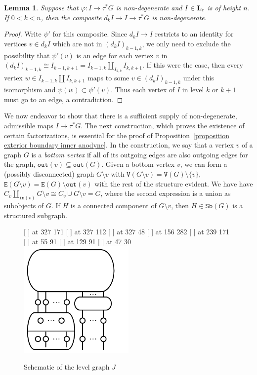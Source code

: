 \documentclass{amsart}
\numberwithin{theorem}{subsection}
\newtheorem{lemma}[theorem]{Lemma}
\theoremstyle{definition}
\newcommand{\name}[1]{\ensuremath{\text{\textup{#1}}}}
\newcommand{\levelg}{\mathbf{L}}
\newcommand{\levelgconn}{\levelg_{\name{c}}}
\newcommand{\sub}{\mathtt{Sb}}
\newcommand{\out}{\mathtt{out}}
\newcommand{\inp}{\mathtt{in}}
\newcommand{\edge}{\mathtt{E}}
\newcommand{\vertex}{\mathtt{V}}
\begin{document}
\begin{lemma}\label{lemma preservation of nondegeneracy}
Suppose that $\varphi \colon I \to \tau^* G$ is non-degenerate and $I \in \levelgconn$ is of height $n$.
If $0< k < n$, then the composite $d_k I \to I \to \tau^* G$ is non-degenerate.
\end{lemma}
\begin{proof}
Write $\psi'$ for this composite. 
Since $d_kI\to I$ restricts to an identity for vertices $v\in d_k I$ which are not in $(d_kI)_{k-1,k}$, we only need to exclude the possibility that $\psi'(v)$ is an edge for each vertex $v$ in $(d_kI)_{k-1,k} \cong I_{k-1,k+1} = I_{k-1,k} \amalg_{I_{k,k}} I_{k,k+1}$. 
If this were the case, then every vertex $w \in I_{k-1,k} \amalg I_{k,k+1}$ maps to some $v\in (d_kI)_{k-1,k}$ under this isomorphism and $\psi(w) \subset \psi'(v)$.
Thus each vertex of $I$ in level $k$ or $k+1$ must go to an edge, a contradiction.
\end{proof}

We now endeavor to show that there is a sufficient supply of non-degenerate, admissible maps $I \to \tau^*G$.
The next construction, which proves the existence of certain factorizations, is essential for the proof of Proposition~\ref{proposition exterior boundary inner anodyne}.
In the construction, we say that a vertex $v$ of a graph $G$ is a \emph{bottom vertex} if all of its outgoing edges are also outgoing edges for the graph, $\out(v) \subseteq \out(G)$.
Given a bottom vertex $v$, we can form a (possibly disconnected) graph $G\setminus v$ with $\vertex(G\setminus v) = \vertex(G) \setminus \{ v \}$, $\edge(G\setminus v) = \edge(G) \setminus \out(v)$ with the rest of the structure evident.
We have have $C_v \amalg_{\inp(v)} G \setminus v \cong C_v \cup G\setminus v = G$, where the second expression is a union as subobjects of $G$.
If $H$ is a connected component of $G\setminus v$, then $H \in \sub(G)$ is a structured subgraph.

\begin{figure}[htb]
\small\hair 2pt
  [ ] at 327 171
  [ ] at 327 112
  [ ] at 327 48
  [ ] at 156 282
  [ ] at 239 171
  [ ] at 55 91
  [ ] at 129 91
  [ ] at 47 30
\endlabellist
\centering
\includegraphics[width=0.5\textwidth]{filtration}
\caption{Schematic of the level graph $J$}
\label{figure J schematic picture}
\end{figure}
\end{document}
